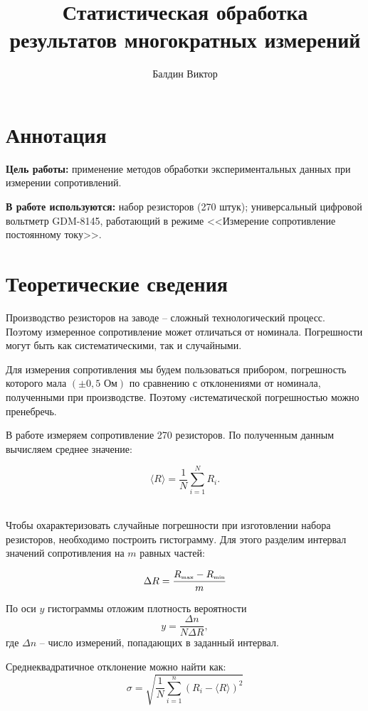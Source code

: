 \documentclass[12pt]{article}
\title{Статистическая обработка результатов многократных измерений}
\author{Балдин Виктор}
\begin{document}
    \maketitle
    \section{Аннотация}
    \par \textbf{Цель работы:} применение методов обработки
    экспериментальных данных при измерении сопротивлений.
    \par \textbf{В работе используются:} набор резисторов (270 штук);
    универсальный цифровой вольтметр GDM-8145, работающий в режиме
    <<Измерение сопротивление постоянному току>>.
    \section{Теоретические сведения}
    \par Производство резисторов на заводе -- сложный технологический процесс.
    Поэтому измеренное сопротивление может отличаться от номинала. Погрешности
    могут быть как систематическими, так и случайными.
    \par Для измерения сопротивления мы будем пользоваться прибором, погрешность
     которого мала  $\left(  \pm 0,5 \mbox{ Ом} \right) $ по сравнению с
     отклонениями от номинала, полученными при производстве. Поэтому cистематической
     погрешностью можно пренебречь.

    \par В работе измеряем сопротивление 270 резисторов.
    По полученным данным вычисляем среднее значение:

    \begin{equation}\label{for1}
        \langle R \rangle = \frac{1}{N} \sum_{i=1}^N R_i.
    \end{equation}\\

    \par Чтобы охарактеризовать случайные погрешности при изготовлении набора резисторов,
    необходимо построить гистограмму. Для этого разделим интервал значений сопротивления на
    $m$ равных частей:

    \begin{equation}
        \Delta R = \frac{R_{\mbox{\tiny{max}}} - R_{\mbox{\tiny{min}}}}{m}
    \end{equation}

    \par По оси $y$ гистограммы отложим плотность вероятности
    \begin{equation}
        y = \frac{\Delta n}{N\Delta R},
    \end{equation}
    где $\Delta n$ -- число измерений, попадающих в заданный интервал.
    \par Среднеквадратичное отклонение можно найти как:
    \begin{equation}
        \sigma = \sqrt{\frac{1}{N}\sum_{i = 1}^{n}(R_i - \langle R\rangle)^2}
    \end{equation}
\end{document}

